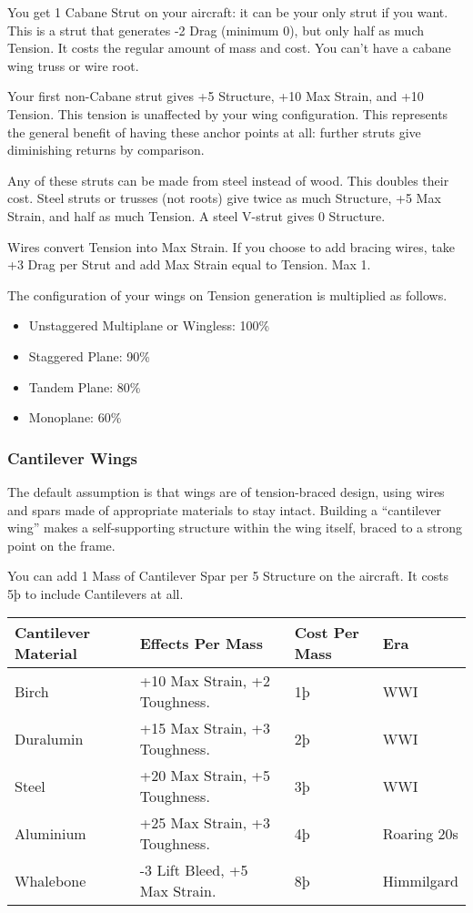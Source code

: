 \documentclass{article}
\begin{document}
You get 1 Cabane Strut on your aircraft: it can be your only
strut if you want. This is a strut that generates -2 Drag (minimum 0),
but only half as much Tension. It costs the regular amount of mass and
cost. You can't have a cabane wing truss or wire root.

Your first non-Cabane strut gives +5 Structure, +10 Max Strain,
and +10 Tension. This tension is unaffected by your wing configuration.
This represents the general benefit of having these anchor points at
all: further struts give diminishing returns by comparison.

Any of these struts can be made from steel instead of wood. This
doubles their cost. Steel struts or trusses (not roots) give twice as
much Structure, +5 Max Strain, and half as much Tension. A steel V-strut
gives 0 Structure.

Wires convert Tension into Max Strain. If you choose to add
bracing wires, take +3 Drag per Strut and add Max Strain equal to
Tension. Max 1.

The configuration of your wings on Tension generation is
multiplied as follows.

\begin{itemize}
  \item          Unstaggered Multiplane or Wingless: 100\%
  \item          Staggered Plane: 90\%
  \item          Tandem Plane: 80\%
  \item          Monoplane: 60\%
\end{itemize}

\subsubsection{Cantilever Wings}
\label{_Cantilever_Wings}

The default assumption is that wings are of tension-braced design, using
wires and spars made of appropriate materials to stay intact. Building a
``cantilever wing'' makes a self-supporting structure within the wing
itself, braced to a strong point on the frame.

You can add 1 Mass of Cantilever Spar per 5 Structure on the aircraft.
It costs 5þ to include Cantilevers at all.

\begin{tabular}{|l|l|l|l|}
  \hline
  Cantilever Material & Effects Per Mass              & Cost Per Mass & Era         \\\hline
  Birch               & +10 Max Strain, +2 Toughness. & 1þ            & WWI         \\\hline
  Duralumin           & +15 Max Strain, +3 Toughness. & 2þ            & WWI         \\\hline
  Steel               & +20 Max Strain, +5 Toughness. & 3þ            & WWI         \\\hline
  Aluminium           & +25 Max Strain, +3 Toughness. & 4þ            & Roaring 20s \\\hline
  Whalebone           & -3 Lift Bleed, +5 Max Strain. & 8þ            & Himmilgard  \\\hline
\end{tabular}
\end{document}
